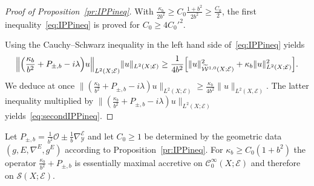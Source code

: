 \documentclass[AHL,Unicode,longabstracts]{cedram}
\newcommand{\clW}{\mathcal{W}}
\newcommand{\clC}{\mathcal{C}}
\newcommand{\clY}{\mathcal{Y}}
\newcommand{\clO}{\mathcal{O}}
\newcommand{\clE}{\mathcal{E}}
\newcommand{\clS}{\mathcal{S}}
\let\originalleft\left
\let\originalright\right
\renewcommand{\left}{\mathopen{}\mathclose\bgroup\originalleft}
\renewcommand{\right}{\aftergroup\egroup\originalright}
\begin{document}
\begin{proof}[Proof of Proposition~\ref{pr:IPPineq}]
With $\frac{\kappa_{b}}{2b^{2}}\geq C_{0}\frac{1+b^{2}}{2b^{2}}\geq \frac{C_{0}}{2}$, the first inequality~\eqref{eq:IPPineq} is proved for $C_{0}\geq 4{C_{0}'}^{2}$.

Using the Cauchy--Schwarz inequality in the left hand side of~\eqref{eq:IPPineq} yields
\[
\left\|\left(\frac{\kappa_{b}}{b^{2}}+P_{\pm, b} - i\lambda\right) u \right\|_{L^{2}(X;\clE)} \|u\|_{L^{2}(X;\clE)} \geq \frac{1}{4b^{2}}
\left[
\|u\|_{\widetilde{\clW}^{1,0}(X;\clE)}^{2} + \kappa_{b} \|u\|_{L^{2}(X;\clE)}^2
\right].
\]
We deduce at once $ \|(\frac{\kappa_{b}}{b^{2}}+P_{\pm, b} - i \lambda) u \|_{L^{2}(X;\clE)} \geq \frac{\kappa_{b}}{4b^{2}}\|u\|_{L^{2}(X,\clE)} $. The latter inequality multiplied by $\|(\frac{\kappa_{b}}{b^{2}}+P_{\pm, b} - i \lambda) u \|_{L^{2}(X;\clE)}$ yields~\eqref{eq:secondIPPineq}.
\end{proof}

\begin{coro}\label{corollary_ess_max_acc}
Let $P_{\pm, b}=\frac{1}{b^{2}}\clO\pm \frac{1}{b}\nabla^{\clE}_{\clY}$ and let $C_{0}\geq 1$ be determined by the geometric data $(g,E,\nabla^{E},g^{E})$ according to Proposition~\ref{pr:IPPineq}. For $\kappa_{b}\geq C_{0}(1+b^{2})$ the operator $\frac{\kappa_{b}}{b^{2}}+P_{\pm,b}$ is essentially maximal accretive on $\clC^{\infty}_{0}(X;\clE)$ and therefore on $\clS(X;\clE)$.
\end{coro}
\end{document}
